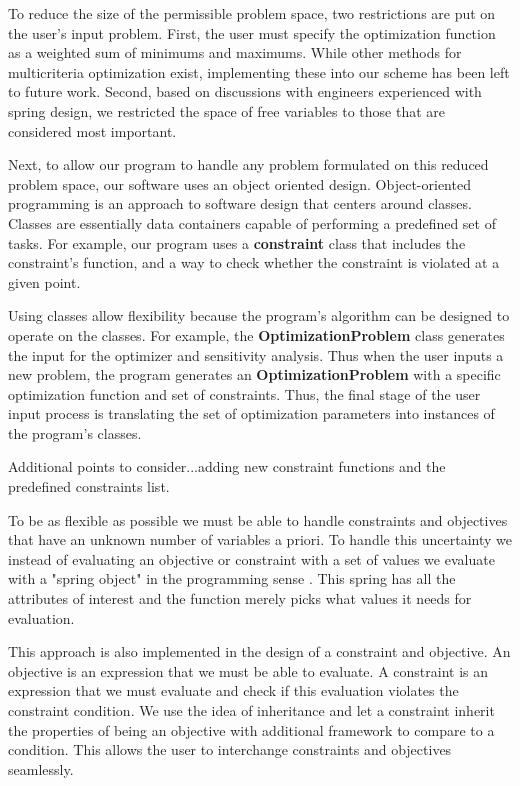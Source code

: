 \documentclass[10pt]{article}
\begin{document}
To reduce the size of the permissible problem space, two restrictions are put on the user's input problem.  First, the user must specify the optimization function as a weighted sum of minimums and maximums.  While other methods for multicriteria optimization exist, implementing these into our scheme has been left to future work.  Second, based on discussions with engineers experienced with spring design, we restricted the space of free variables to those that are considered most important.

Next, to allow our program to handle any problem formulated on this reduced problem space, our software uses an object oriented design.  Object-oriented programming is an approach to software design that centers around classes.  Classes are essentially data containers capable of performing a predefined set of tasks.  For example, our program uses a \textbf{constraint} class that includes the constraint's function, and a way to check whether the constraint is violated at a given point.

Using classes allow flexibility because the program's algorithm can be designed to operate on the classes.  For example, the \textbf{OptimizationProblem} class generates the input for the optimizer and sensitivity analysis.  Thus when the user inputs a new problem, the program generates an \textbf{OptimizationProblem} with a specific optimization function and set of constraints.  Thus, the final stage of the user input process is translating the set of optimization parameters into instances of the program's classes.

Additional points to consider...adding new constraint functions and the predefined constraints list.

To be as flexible as possible we must be able to handle constraints and objectives that have an unknown number of  variables a priori. To handle this uncertainty we instead of evaluating an objective or constraint with a set of values we evaluate with a "spring object" in the programming sense \cite{OOP}. This spring has all the attributes of interest and the function merely picks what values it needs for evaluation. 

This approach is also implemented in the design of a constraint and objective. An objective is an expression that we must be able to evaluate. A constraint is an expression that we must evaluate and check if this evaluation violates the constraint condition. We use the idea of inheritance and let a constraint inherit the properties of being an objective with additional framework to compare to a condition. This allows the user to interchange constraints and objectives seamlessly.
\end{document}

